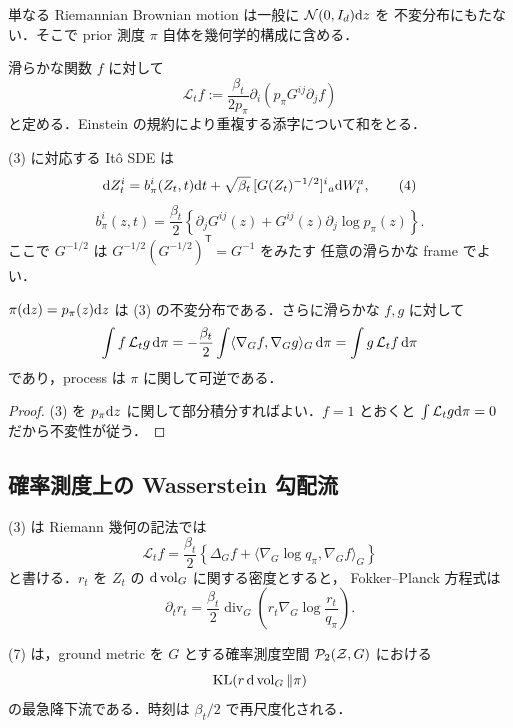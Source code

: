 \documentclass[uplatex,dvipdfmx,11pt,a4paper]{jsarticle}
\begin{document}
単なる Riemannian Brownian motion は一般に $\mathcal{N}(0,I_d)\mathrm{d} z$ を
不変分布にもたない．そこで prior 測度 $\pi$ 自体を幾何学的構成に含める．

\begin{definition}
\label{def:generator}
  滑らかな関数 $f$ に対して
  \[
    \boxed{
    \mathcal{L}_t f
    :=\frac{\beta_t}{2p_\pi}
      \partial_i\!\left(p_\pi G^{ij}\partial_jf\right)
    }
    \tag{3}
  \]
  と定める．Einstein の規約により重複する添字について和をとる．
\end{definition}

(3) に対応する It\^o SDE は
\[
  \mathrm{d} Z_t^i=b_\pi^i(Z_t,t)\mathrm{d} t
       +\sqrt{\beta_t}\,[G(Z_t)^{-1/2}]^i{}_a\mathrm{d} W_t^a,
  \tag{4}
\]
\[
  \boxed{
  b_\pi^i(z,t)
  =\frac{\beta_t}{2}
    \left\{\partial_jG^{ij}(z)+G^{ij}(z)\partial_j\log p_\pi(z)\right\}.
  }
  \tag{5}
\]
ここで $G^{-1/2}$ は $G^{-1/2}(G^{-1/2})^{\mathsf T}=G^{-1}$ をみたす
任意の滑らかな frame でよい．

\begin{proposition}
\label{prop:reversible}
  $\pi(\mathrm{d} z)=p_\pi(z)\mathrm{d} z$ は (3) の不変分布である．さらに滑らかな
  $f,g$ に対して
  \[
    \int f\,\mathcal{L}_tg\,\mathrm{d}\pi
    =-\frac{\beta_t}{2}\int
      \langle\nabla_Gf,\nabla_Gg\rangle_G\,\mathrm{d}\pi
    =\int g\,\mathcal{L}_tf\,\mathrm{d}\pi
  \]
  であり，process は $\pi$ に関して可逆である．
\end{proposition}

\begin{proof}
  (3) を $p_\pi\mathrm{d} z$ に関して部分積分すればよい．$f=1$ とおくと
  $\int\mathcal{L}_tg\mathrm{d}\pi=0$ だから不変性が従う．
\end{proof}

\subsection{確率測度上の Wasserstein 勾配流}

(3) は Riemann 幾何の記法では
\[
  \mathcal{L}_tf
  =\frac{\beta_t}{2}
   \left\{\Delta_Gf+
     \langle\nabla_G\log q_\pi,\nabla_Gf\rangle_G\right\}
  \tag{6}
\]
と書ける．$r_t$ を $Z_t$ の $\mathrm{d}\operatorname{vol}_G$ に関する密度とすると，
Fokker--Planck 方程式は
\[
  \partial_tr_t
  =\frac{\beta_t}{2}\operatorname{div}_G
    \left(r_t\nabla_G\log\frac{r_t}{q_\pi}\right).
  \tag{7}
\]

\begin{proposition}
\label{prop:gradient-flow}
  (7) は，ground metric を $G$ とする確率測度空間
  $\mathcal{P}_{2}(\mathcal{Z},G)$ における
  \[
    \mathrm{KL}(r\,\mathrm{d}\operatorname{vol}_G\Vert\pi)
  \]
  の最急降下流である．時刻は $\beta_t/2$ で再尺度化される．
\end{proposition}
\end{document}
